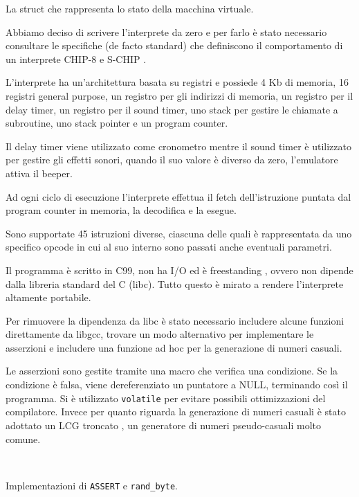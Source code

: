 \documentclass[a4paper]{article}
\begin{document}
\begin{Listing}[h!t] %
    \centering
    \caption{La struct che rappresenta lo stato della macchina virtuale.}
    \label{chip8_struct}
\end{Listing}

Abbiamo deciso di scrivere l'interprete da zero e per farlo è stato necessario consultare
le specifiche (de facto standard) che definiscono il comportamento di un interprete CHIP-8
\cite{cowgod:chip8} e S-CHIP \cite{cowgod:schip}.

L'interprete ha un'architettura basata su registri e possiede 4 Kb di memoria, 16 registri
general purpose, un registro per gli indirizzi di memoria, un registro per il delay timer,
un registro per il sound timer, uno stack per gestire le chiamate a subroutine, uno stack pointer
e un program counter.

Il delay timer viene utilizzato come cronometro mentre il sound
timer è utilizzato per gestire gli effetti sonori, quando il suo
valore è diverso da zero, l'emulatore attiva il beeper.

Ad ogni ciclo di esecuzione l'interprete effettua il fetch
dell'istruzione puntata dal program counter in memoria,
la decodifica e la esegue.

Sono supportate 45 istruzioni diverse, ciascuna delle
quali è rappresentata da uno specifico opcode in cui al suo interno
sono passati anche eventuali parametri.

Il programma è scritto in C99, non ha I/O ed è freestanding
\cite{n1256:conformance}, ovvero non dipende dalla libreria
standard del C (libc). Tutto questo è mirato a rendere l'interprete
altamente portabile.

Per rimuovere la dipendenza da libc è stato necessario includere
alcune funzioni direttamente da libgcc, trovare un modo alternativo
per implementare le asserzioni e includere una funzione ad hoc per
la generazione di numeri casuali.

Le asserzioni sono gestite tramite una macro che verifica una condizione.
Se la condizione è falsa, viene dereferenziato un puntatore a NULL, terminando
così il programma. Si è utilizzato \texttt{volatile} per evitare possibili ottimizzazioni
del compilatore. Invece per quanto riguarda la generazione di numeri casuali è stato
adottato un LCG troncato \cite{wikipedia:lcg}, un generatore di numeri pseudo-casuali
molto comune.

\clearpage

\begin{Listing}[h!t]
    \centering
    \mbox{
        \quad
    }
    \caption{Implementazioni di \texttt{ASSERT} e \texttt{rand\_byte}.}
    \label{assert_rand}
\end{Listing}
\end{document}
